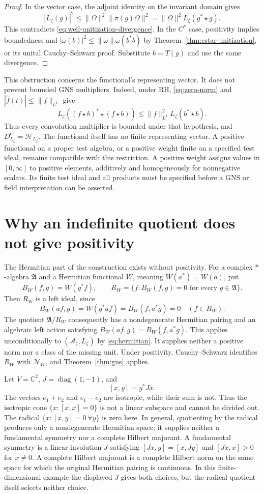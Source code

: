 \documentclass[11pt]{article}
\numberwithin{equation}{section}
\newcommand{\cA}{\mathcal A}
\newcommand{\cN}{\mathcal N}
\newcommand{\C}{\mathbb C}
\begin{document}
\begin{proof}
In the vector case, the adjoint identity on the invariant domain gives
\[
 |L_\zeta(g)|^2
 \leq\|\Omega\|^2\|\pi(g)\Omega\|^2
 =\|\Omega\|^2L_\zeta(g^*\star g).
\]
This contradicts \eqref{eq:weil-unitization-divergence}.
In the $C^*$ case, positivity implies boundedness and
$|\omega(b)|^2\leq\|\omega\|\omega(b^*b)$ by
Theorem~\ref{thm:cstar-unitization}, or its unital Cauchy--Schwarz proof.
Substitute $b=T(g)$ and use the same divergence.
\end{proof}

This obstruction concerns the functional's representing vector.
It does not prevent bounded GNS multipliers.  Indeed, under RH,
\eqref{eq:zero-norm} and $|\widehat f(t)|\leq\|f\|_{L^1}$ give
\[
 L_\zeta((f\star b)^*\star(f\star b))
 \leq\|f\|_{L^1}^2 L_\zeta(b^*\star b).
\]
Thus every convolution multiplier is bounded under that hypothesis,
and $D_{L_\zeta}^{\mathrm{cl}}=\mathcal H_{L_\zeta}$.
The functional itself has no finite representing vector.
A positive functional on a proper test algebra, or a positive weight
finite on a specified test ideal, remains compatible with this restriction.
A positive weight assigns values in $[0,\infty]$ to positive elements,
additively and homogeneously for nonnegative scalars.  Its finite test
ideal and all products must be specified before a GNS or field
interpretation can be asserted.

\section{Why an indefinite quotient does not give positivity}

The Hermitian part of the construction exists without positivity.
For a complex $*$-algebra $\mathfrak A$ and a Hermitian functional $W$,
meaning $W(a^*)=\overline{W(a)}$, put
\[
 B_W(f,g)=W(g^*f),\qquad
 R_W=\{f:B_W(f,g)=0\text{ for every }g\in\mathfrak A\}.
\]
Then $R_W$ is a left ideal, since
\[
 B_W(af,g)=W(g^*af)=B_W(f,a^*g)=0\quad(f\in R_W).
\]
The quotient $\mathfrak A/R_W$ consequently has a nondegenerate Hermitian
pairing and an algebraic left action satisfying
$B_W(af,g)=B_W(f,a^*g)$.
This applies unconditionally to $(\cA_\zeta,L_\zeta)$ by
\eqref{eq:hermitian}.  It supplies neither a positive norm nor a class of
the missing unit.  Under positivity, Cauchy--Schwarz identifies $R_W$
with $\cN_W$, and Theorem~\ref{thm:gns} applies.

Let $V=\C^2$, $J=\operatorname{diag}(1,-1)$, and
\[
 [x,y]=y^*Jx.
\]
The vectors $e_1+e_2$ and $e_1-e_2$ are isotropic, while their sum is
not.  Thus the isotropic cone $\{x:[x,x]=0\}$ is not a linear subspace
and cannot be divided out.  The radical
$\{x:[x,y]=0\ \forall y\}$ is zero here.  In general, quotienting by the
radical produces only a nondegenerate Hermitian space; it supplies
neither a fundamental symmetry nor a complete Hilbert majorant.
A fundamental symmetry is a linear involution $J$ satisfying
$[Jx,y]=[x,Jy]$ and $[Jx,x]>0$ for $x\ne0$.
A complete Hilbert majorant is a complete Hilbert norm on the same space
for which the original Hermitian pairing is continuous.
In this finite-dimensional example the displayed $J$ gives both choices,
but the radical quotient itself selects neither choice.
\end{document}
